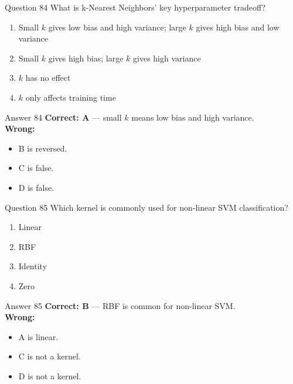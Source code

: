 \documentclass[aspectratio=169,11pt]{beamer}
\begin{document}
	\begin{frame}{Question 84}
		What is k-Nearest Neighbors' key hyperparameter tradeoff?
		\begin{enumerate}[label=\Alph*.]
			\item Small $k$ gives low bias and high variance; large $k$ gives high bias and low variance
			\item Small $k$ gives high bias; large $k$ gives high variance
			\item $k$ has no effect
			\item $k$ only affects training time
		\end{enumerate}
	\end{frame}
	\begin{frame}{Answer 84}
		\textbf{Correct: A} --- small $k$ means low bias and high variance.\\
		\vspace{0.5em}
		\textbf{Wrong:}
		\begin{itemize}
			\item B is reversed.
			\item C is false.
			\item D is false.
		\end{itemize}
	\end{frame}
	
	\begin{frame}{Question 85}
		Which kernel is commonly used for non-linear SVM classification?
		\begin{enumerate}[label=\Alph*.]
			\item Linear
			\item RBF
			\item Identity
			\item Zero
		\end{enumerate}
	\end{frame}
	\begin{frame}{Answer 85}
		\textbf{Correct: B} --- RBF is common for non-linear SVM.\\
		\vspace{0.5em}
		\textbf{Wrong:}
		\begin{itemize}
			\item A is linear.
			\item C is not a kernel.
			\item D is not a kernel.
		\end{itemize}
	\end{frame}
	
\end{document}
